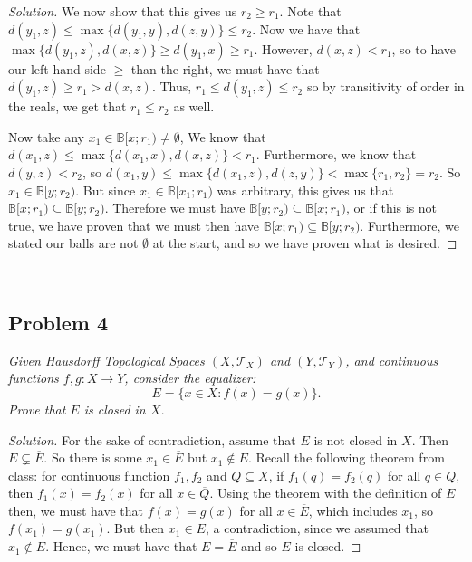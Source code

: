 \documentclass{article}
\begin{document}
\begin{enumerate}
\begin{proof}[Solution]
			We now show that this gives us $r_2 \geq r_1$.
			Note that $d(y_1,z) \leq \max\{d(y_1,y),d(z,y)\} \leq r_2$.
			Now we have that $\max\{d(y_1,z),d(x,z)\} \geq d(y_1,x) \geq r_1$.
			However, $d(x,z) < r_1$, so to have our left hand side $\geq$ than the right,
			we must have that $d(y_1,z) \geq r_1 > d(x,z)$.
			Thus, $r_1 \leq d(y_1,z) \leq r_2$ so by transitivity of order in the reals,
			we get that $r_1 \leq r_2$ as well.

			Now take any $x_1 \in \mathbb{B}[x;r_1) \neq \emptyset$,
			We know that $d(x_1,z) \leq \max\{d(x_1,x),d(x,z)\} < r_1$.
			Furthermore, we know that $d(y,z) < r_2$,
			so $d(x_1,y) \leq \max\{d(x_1,z),d(z,y)\} < \max\{r_1,r_2\} = r_2$.
			So $x_1 \in \mathbb{B}[y;r_2)$.
			But since $x_1 \in \mathbb{B}[x_1;r_1)$ was arbitrary,
			this gives us that $\mathbb{B}[x;r_1) \subseteq \mathbb{B}[y;r_2)$.
			Therefore we must have $\mathbb{B}[y;r_2) \subseteq \mathbb{B}[x;r_1)$,
			or if this is not true, we have proven that we must then have
			$\mathbb{B}[x;r_1) \subseteq \mathbb{B}[y;r_2)$.
			Furthermore, we stated our balls are not $\emptyset$ at the start,
			and so we have proven what is desired.
	\end{proof}
\end{enumerate}
\clearpage
~\clearpage

\subsection*{Problem 4}
{\it Given Hausdorff Topological Spaces $(X,\mathcal{T}_X)$ and $(Y,\mathcal{T}_Y)$,
and continuous functions $f,g \colon X \to Y$, consider the \emph{equalizer}:
\[
	E = \{x \in X \colon f(x) = g(x)\}.
\]
Prove that $E$ is closed in $X$.}

\begin{proof}[Solution]\let\qed\relax
	For the sake of contradiction, assume that $E$ is not closed in $X$.
	Then $E \subsetneq \overline{E}$.
	So there is some $x_1 \in \overline{E}$ but $x_1 \not\in E$.
	Recall the following theorem from class:
	for continuous function $f_1,f_2$ and $Q \subseteq X$,
	if $f_1(q)=f_2(q)$ for all $q \in Q$, then $f_1(x) = f_2(x)$ for all $x \in \overline{Q}$.
	Using the theorem with the definition of $E$ then, we must have that $f(x)=g(x)$
	for all $x \in \overline{E}$, which includes $x_1$,
	so $f(x_1) = g(x_1)$.
	But then $x_1 \in E$, a contradiction, since we assumed that $x_1 \not\in E$.
	Hence, we must have that $E = \overline{E}$ and so $E$ is closed.
\end{proof}
\clearpage
~\clearpage
\end{document}
